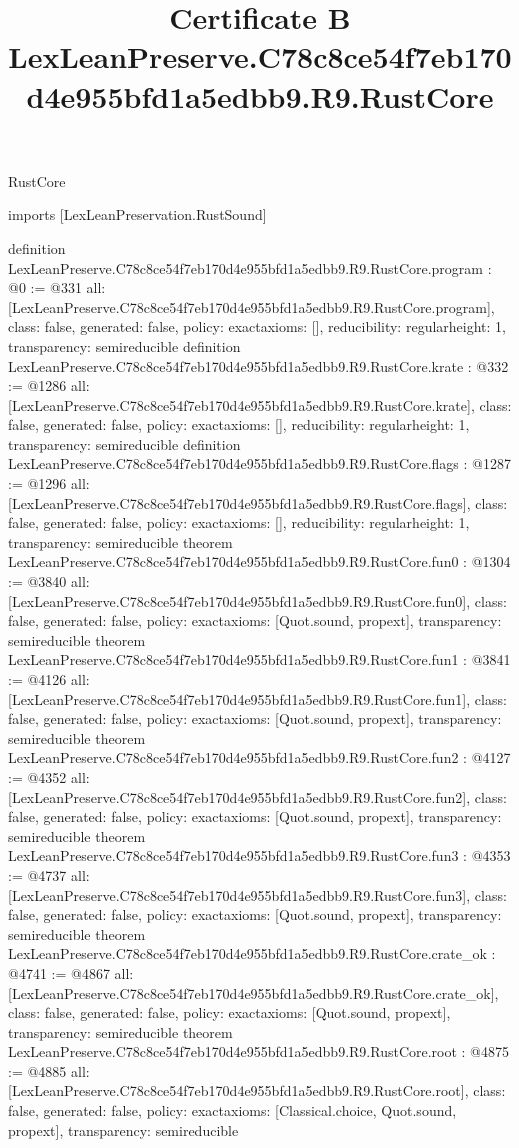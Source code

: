 \begin{lexlean}{RustCore}
\title{Certificate B LexLeanPreserve.C78c8ce54f7eb170d4e955bfd1a5edbb9.R9.RustCore}
\begin{coremodule}
imports [LexLeanPreservation.RustSound]

definition LexLeanPreserve.C78c8ce54f7eb170d4e955bfd1a5edbb9.R9.RustCore.program : @0 := @331 {
  all: [LexLeanPreserve.C78c8ce54f7eb170d4e955bfd1a5edbb9.R9.RustCore.program],
  class: false,
  generated: false,
  policy: exact{axioms: []},
  reducibility: regular{height: 1},
  transparency: semireducible
}
definition LexLeanPreserve.C78c8ce54f7eb170d4e955bfd1a5edbb9.R9.RustCore.krate : @332 := @1286 {
  all: [LexLeanPreserve.C78c8ce54f7eb170d4e955bfd1a5edbb9.R9.RustCore.krate],
  class: false,
  generated: false,
  policy: exact{axioms: []},
  reducibility: regular{height: 1},
  transparency: semireducible
}
definition LexLeanPreserve.C78c8ce54f7eb170d4e955bfd1a5edbb9.R9.RustCore.flags : @1287 := @1296 {
  all: [LexLeanPreserve.C78c8ce54f7eb170d4e955bfd1a5edbb9.R9.RustCore.flags],
  class: false,
  generated: false,
  policy: exact{axioms: []},
  reducibility: regular{height: 1},
  transparency: semireducible
}
theorem LexLeanPreserve.C78c8ce54f7eb170d4e955bfd1a5edbb9.R9.RustCore.fun0 : @1304 := @3840 {
  all: [LexLeanPreserve.C78c8ce54f7eb170d4e955bfd1a5edbb9.R9.RustCore.fun0],
  class: false,
  generated: false,
  policy: exact{axioms: [Quot.sound, propext]},
  transparency: semireducible
}
theorem LexLeanPreserve.C78c8ce54f7eb170d4e955bfd1a5edbb9.R9.RustCore.fun1 : @3841 := @4126 {
  all: [LexLeanPreserve.C78c8ce54f7eb170d4e955bfd1a5edbb9.R9.RustCore.fun1],
  class: false,
  generated: false,
  policy: exact{axioms: [Quot.sound, propext]},
  transparency: semireducible
}
theorem LexLeanPreserve.C78c8ce54f7eb170d4e955bfd1a5edbb9.R9.RustCore.fun2 : @4127 := @4352 {
  all: [LexLeanPreserve.C78c8ce54f7eb170d4e955bfd1a5edbb9.R9.RustCore.fun2],
  class: false,
  generated: false,
  policy: exact{axioms: [Quot.sound, propext]},
  transparency: semireducible
}
theorem LexLeanPreserve.C78c8ce54f7eb170d4e955bfd1a5edbb9.R9.RustCore.fun3 : @4353 := @4737 {
  all: [LexLeanPreserve.C78c8ce54f7eb170d4e955bfd1a5edbb9.R9.RustCore.fun3],
  class: false,
  generated: false,
  policy: exact{axioms: [Quot.sound, propext]},
  transparency: semireducible
}
theorem LexLeanPreserve.C78c8ce54f7eb170d4e955bfd1a5edbb9.R9.RustCore.crate_ok : @4741 := @4867 {
  all: [LexLeanPreserve.C78c8ce54f7eb170d4e955bfd1a5edbb9.R9.RustCore.crate_ok],
  class: false,
  generated: false,
  policy: exact{axioms: [Quot.sound, propext]},
  transparency: semireducible
}
theorem LexLeanPreserve.C78c8ce54f7eb170d4e955bfd1a5edbb9.R9.RustCore.root : @4875 := @4885 {
  all: [LexLeanPreserve.C78c8ce54f7eb170d4e955bfd1a5edbb9.R9.RustCore.root],
  class: false,
  generated: false,
  policy: exact{axioms: [Classical.choice, Quot.sound, propext]},
  transparency: semireducible
}


\end{coremodule}
\end{lexlean}
